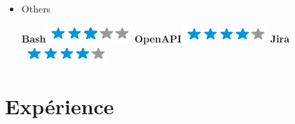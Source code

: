 \documentclass[]{friggeri-cv}
\begin{document}
\begin{flushright}
\begin{multicols}{3}
\begin{itemize}
\item Others \
\begin{flushright}

\textbf{Bash}\includegraphics[scale=0.40]{res/img/3stars.png}
\textbf{OpenAPI}\includegraphics[scale=0.40]{res/img/4stars.png}
\textbf{Jira}\includegraphics[scale=0.40]{res/img/4stars.png}
\end{flushright}            


        \end{itemize}
        \end{multicols}
        \end{flushright}
        \vspace*{-0.65cm}
\section{Expérience}
\vspace*{-0.25cm}
\end{document}
